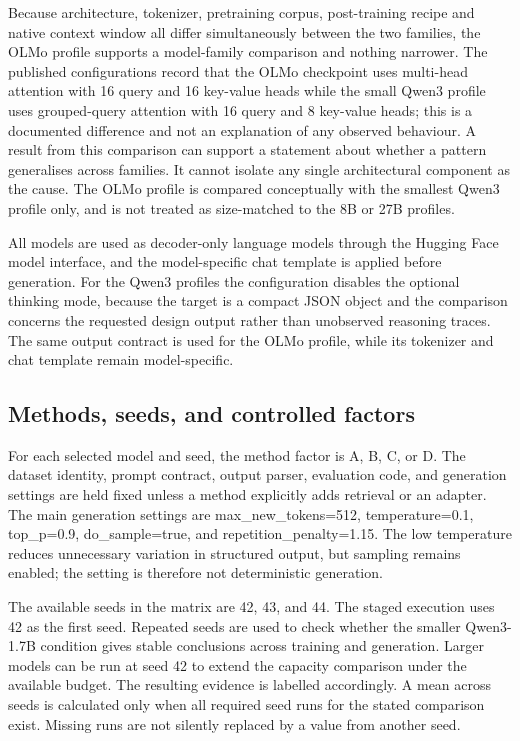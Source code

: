 Because architecture, tokenizer, pretraining corpus, post-training recipe and native context window all differ simultaneously between the two families, the OLMo profile supports a model-family comparison and nothing narrower. The published configurations record that the OLMo checkpoint uses multi-head attention with 16 query and 16 key-value heads while the small Qwen3 profile uses grouped-query attention with 16 query and 8 key-value heads; this is a documented difference and not an explanation of any observed behaviour. A result from this comparison can support a statement about whether a pattern generalises across families. It cannot isolate any single architectural component as the cause. The OLMo profile is compared conceptually with the smallest Qwen3 profile only, and is not treated as size-matched to the 8B or 27B profiles.

All models are used as decoder-only language models through the Hugging Face model interface, and the model-specific chat template is applied before generation. For the Qwen3 profiles the configuration disables the optional thinking mode, because the target is a compact JSON object and the comparison concerns the requested design output rather than unobserved reasoning traces. The same output contract is used for the OLMo profile, while its tokenizer and chat template remain model-specific.

\subsection{Methods, seeds, and controlled factors}

For each selected model and seed, the method factor is A, B, C, or D. The dataset identity, prompt contract, output parser, evaluation code, and generation settings are held fixed unless a method explicitly adds retrieval or an adapter. The main generation settings are max\_new\_tokens=512, temperature=0.1, top\_p=0.9, do\_sample=true, and repetition\_penalty=1.15. The low temperature reduces unnecessary variation in structured output, but sampling remains enabled; the setting is therefore not deterministic generation.

The available seeds in the matrix are 42, 43, and 44. The staged execution uses 42 as the first seed. Repeated seeds are used to check whether the smaller Qwen3-1.7B condition gives stable conclusions across training and generation. Larger models can be run at seed 42 to extend the capacity comparison under the available budget. The resulting evidence is labelled accordingly. A mean across seeds is calculated only when all required seed runs for the stated comparison exist. Missing runs are not silently replaced by a value from another seed.

